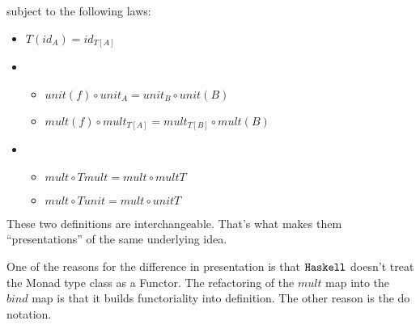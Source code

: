 subject to the following laws:

\begin{itemize}
  \item $T( id_A ) = id_{T[A]}$ %
  \item %
    \begin{itemize}
    \item $unit(f) \circ unit_{A} = unit_{B} \circ unit(B)$ %
    \item $mult(f) \circ mult_{T[A]} = mult_{T[B]} \circ mult(B)$ %
    \end{itemize}
  \item %
    \begin{itemize}
    \item $mult \circ T mult = mult \circ mult T$ %
    \item $mult \circ T unit = mult \circ unit T$ %
    \end{itemize}
\end{itemize}

These two definitions are interchangeable. That's what makes them
``presentations'' of the same underlying idea.

One of the reasons for the difference in presentation is that $\texttt{Haskell}$
doesn't treat the Monad type class as a Functor. The refactoring of
the $mult$ map into the $bind$ map is that it builds functoriality
into definition. The other reason is the do notation.




